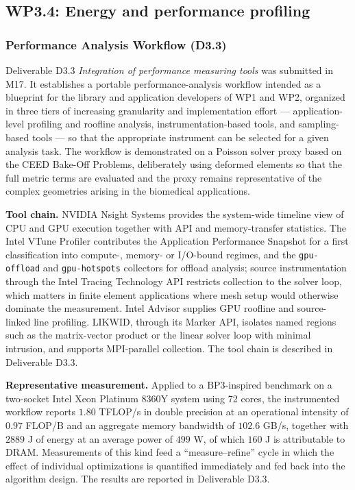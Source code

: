 \documentclass[a4paper,12pt, numbers]{article}
\begin{document}
\subsection{WP3.4: Energy and performance profiling}
\subsubsection*{Performance Analysis Workflow (D3.3)}

\noindent Deliverable D3.3 \emph{Integration of performance measuring tools} was submitted in M17. It establishes a portable performance-analysis workflow intended as a blueprint for the library and application developers of WP1 and WP2, organized in three tiers of increasing granularity and implementation effort --- application-level profiling and roofline analysis, instrumentation-based tools, and sampling-based tools --- so that the appropriate instrument can be selected for a given analysis task. The workflow is demonstrated on a Poisson solver proxy based on the CEED Bake-Off Problems, deliberately using deformed elements so that the full metric terms are evaluated and the proxy remains representative of the complex geometries arising in the biomedical applications.

\noindent\textbf{Tool chain.}
NVIDIA Nsight Systems provides the system-wide timeline view of CPU and GPU execution together with API and memory-transfer statistics. The Intel VTune Profiler contributes the Application Performance Snapshot for a first classification into compute-, memory- or I/O-bound regimes, and the \texttt{gpu-offload} and \texttt{gpu-hotspots} collectors for offload analysis; source instrumentation through the Intel Tracing Technology API restricts collection to the solver loop, which matters in finite element applications where mesh setup would otherwise dominate the measurement. Intel Advisor supplies GPU roofline and source-linked line profiling. LIKWID, through its Marker API, isolates named regions such as the matrix-vector product or the linear solver loop with minimal intrusion, and supports MPI-parallel collection. The tool chain is described in Deliverable D3.3.

\noindent\textbf{Representative measurement.}
Applied to a BP3-inspired benchmark on a two-socket Intel Xeon Platinum 8360Y system using 72 cores, the instrumented workflow reports $1.80$ TFLOP/s in double precision at an operational intensity of $0.97$ FLOP/B and an aggregate memory bandwidth of $102.6$ GB/s, together with $2889$ J of energy at an average power of $499$ W, of which $160$ J is attributable to DRAM. Measurements of this kind feed a ``measure--refine'' cycle in which the effect of individual optimizations is quantified immediately and fed back into the algorithm design. The results are reported in Deliverable D3.3.
\end{document}
